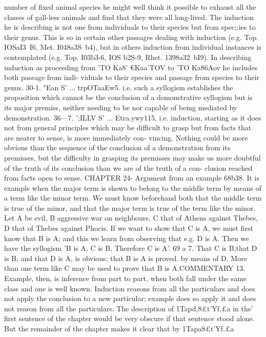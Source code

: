 {{{{{{{{{{{{{{{{{{{{{{{{{number of fixed animal species he might well think it possible
to exhaust all the classes of gall-less animals and find that they
were all long-lived. The induction he is describing is not one
from individuals to their species but from spec;:ies to their genus.
This is so in certain other passages dealing with induction (e.g.
Top. IOSaI3~I6, Met. I048a3S~b4), but in others induction from
individual instances is contemplated (e.g. Top. I03b3-6, IOS b2S-9,
Rhet. 1398a32~bI9). In describing induction as proceeding from
'TO Ka8' €Kaa'TOV to 'TO Ka86Aov he includes both passage from indi-
viduals to their species and passage from species to their genus.
30-1. "Ean S' ... trpOTaaEw5. i.e. such a syllogism establishes
the proposition which cannot be the conclusion of a demonstrative
syllogism but is its major premiss, neither needing to be nor
capable of being mediated by demonstration.
36---7. ';ILLV S' ... Etra.ywy115, i.e. induction, starting as it does
not from general principles which may be difficult to grasp but
from facts that are neater to sense, is more immediately con-
vincing. Nothing could be more obvious than the sequence of
the conclusion of a demonstration from its premisses, but the
difficulty in grasping its premisses may make us more doubtful
of the truth of its conclusion than we are of the truth of a con-
clusion reached from facts open to sense.
CHAPTER 24-
Argument from an example
68b38. It is example when the major term is shown to belong
to the middle term by means of a term like the minor term. We
must know beforehand both that the middle term is true of the
minor, and that the major term is true of the term like the minor.
Let A be evil, B aggressive war on neighbours, C that of Athens
against Thebes, D that of Thebes against Phocis. If we want to
show that C is A, we must first know that B is A; and this we
learn from observing that e.g. D is A. Then we have the syllogism
'B is A, C is B, Therefore C is A'.
69 a 7. That C is B,that D is B, and that D is A, is obvious;
that B is A is proved. by means of D. More than one term like C
may be used to prove that B is A.COMMENTARY
13. Example, then, is inference from part to part, when both
fall under the same class and one is well known. Induction
reasons from all the particulars and does not apply the conclusion
to a new particular; example does so apply it and does not reason
from all the particulars.
The description of 1Tapd,8£t'Yf.£a in the' first sentence of the
chapter would be very obscure if that sentence stood alone.
But the remainder of the chapter makes it clear that by 1Tapa8£t'Yf.£a
}}}}}}}}}}}}}}}}}}}}}}}}}
